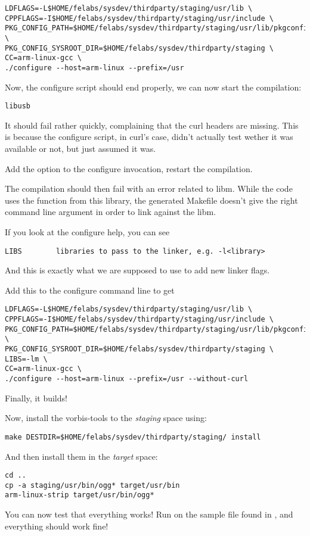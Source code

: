 \small
\begin{verbatim}
LDFLAGS=-L$HOME/felabs/sysdev/thirdparty/staging/usr/lib \
CPPFLAGS=-I$HOME/felabs/sysdev/thirdparty/staging/usr/include \
PKG_CONFIG_PATH=$HOME/felabs/sysdev/thirdparty/staging/usr/lib/pkgconfig \
PKG_CONFIG_SYSROOT_DIR=$HOME/felabs/sysdev/thirdparty/staging \
CC=arm-linux-gcc \
./configure --host=arm-linux --prefix=/usr
\end{verbatim}
\normalsize

Now, the configure script should end properly, we can now start the
compilation:
\begin{verbatim}
libusb
\end{verbatim}

It should fail rather quickly, complaining that the curl headers are
missing. This is because the configure script, in curl's case, didn't
actually test wether it was available or not, but just assumed it was.

Add the  option to the configure invocation,
restart the compilation.

The compilation should then fail with an error related to libm. While
the code uses the function from this library, the generated Makefile
doesn't give the right command line argument in order to link against
the libm.

If you look at the configure help, you can see
\begin{verbatim}
LIBS        libraries to pass to the linker, e.g. -l<library>
\end{verbatim}

And this is exactly what we are supposed to use to add new linker
flags.

Add this to the configure command line to get
\begin{verbatim}
LDFLAGS=-L$HOME/felabs/sysdev/thirdparty/staging/usr/lib \
CPPFLAGS=-I$HOME/felabs/sysdev/thirdparty/staging/usr/include \
PKG_CONFIG_PATH=$HOME/felabs/sysdev/thirdparty/staging/usr/lib/pkgconfig \
PKG_CONFIG_SYSROOT_DIR=$HOME/felabs/sysdev/thirdparty/staging \
LIBS=-lm \
CC=arm-linux-gcc \
./configure --host=arm-linux --prefix=/usr --without-curl
\end{verbatim}

Finally, it builds!

Now, install the vorbis-tools to the {\em staging} space using:

\begin{verbatim}
make DESTDIR=$HOME/felabs/sysdev/thirdparty/staging/ install
\end{verbatim}

And then install them in the {\em target} space:

\begin{verbatim}
cd ..
cp -a staging/usr/bin/ogg* target/usr/bin
arm-linux-strip target/usr/bin/ogg*
\end{verbatim}

You can now test that everything works! Run \code{ogg123} on the
sample file found in , and everything should
work fine!
